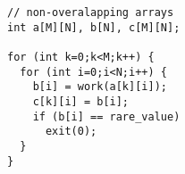 \begin{lstlisting}[morekeywords={g_qCount},belowskip=0pt]
// non-overalapping arrays
int a[M][N], b[N], c[M][N];

for (int k=0;k<M;k++) {
  for (int i=0;i<N;i++) {
    b[i] = work(a[k][i]);
    c[k][i] = b[i];
    if (b[i] == rare_value)
      exit(0);
  }
}
\end{lstlisting}
